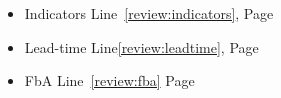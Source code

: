 \documentclass[review]{elsarticle}
\begin{document}
\begin{itemize}
 \item Indicators Line~\ref{review:indicators}, Page \pageref{review:indicators}

 \item Lead-time Line\ref{review:leadtime}, Page \pageref{review:leadtime}

 \item FbA Line~\ref{review:fba} Page \pageref{review:fba}

\end{itemize}
\end{document}
